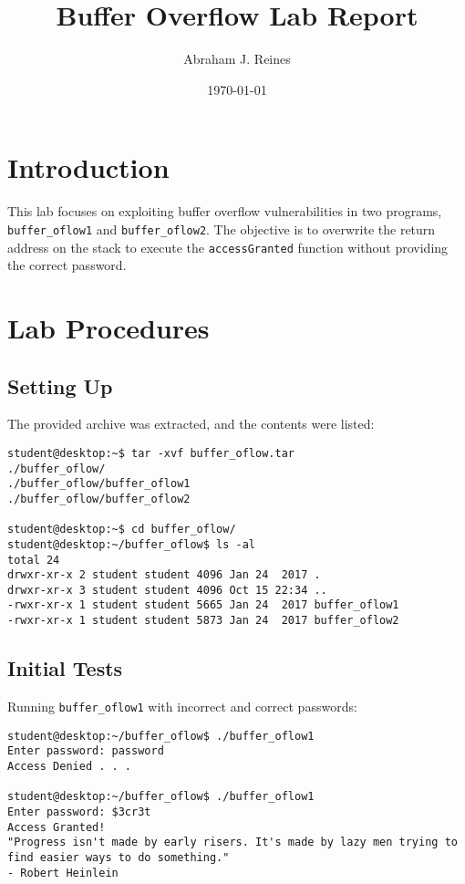 \documentclass[12pt]{article}
\begin{document}
\title{Buffer Overflow Lab Report}
\author{Abraham J. Reines}
\date{\today}
\maketitle

\section{Introduction}

This lab focuses on exploiting buffer overflow vulnerabilities in two programs, \texttt{buffer\_oflow1} and \texttt{buffer\_oflow2}. The objective is to overwrite the return address on the stack to execute the \texttt{accessGranted} function without providing the correct password.

\section{Lab Procedures}

\subsection{Setting Up}

The provided archive was extracted, and the contents were listed:

\begin{lstlisting}[style=terminal]
student@desktop:~$ tar -xvf buffer_oflow.tar
./buffer_oflow/
./buffer_oflow/buffer_oflow1
./buffer_oflow/buffer_oflow2

student@desktop:~$ cd buffer_oflow/
student@desktop:~/buffer_oflow$ ls -al
total 24
drwxr-xr-x 2 student student 4096 Jan 24  2017 .
drwxr-xr-x 3 student student 4096 Oct 15 22:34 ..
-rwxr-xr-x 1 student student 5665 Jan 24  2017 buffer_oflow1
-rwxr-xr-x 1 student student 5873 Jan 24  2017 buffer_oflow2
\end{lstlisting}

\subsection{Initial Tests}

Running \texttt{buffer\_oflow1} with incorrect and correct passwords:

\begin{lstlisting}[style=terminal]
student@desktop:~/buffer_oflow$ ./buffer_oflow1 
Enter password: password
Access Denied . . . 

student@desktop:~/buffer_oflow$ ./buffer_oflow1 
Enter password: $3cr3t
Access Granted!
"Progress isn't made by early risers. It's made by lazy men trying to find easier ways to do something."
- Robert Heinlein
\end{lstlisting}
\end{document}
